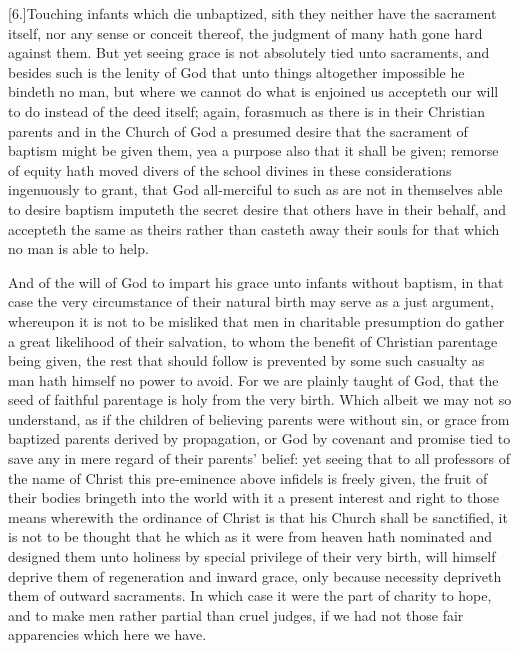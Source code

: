 [6.]Touching infants which die unbaptized, sith they  neither have the sacrament itself, nor any sense or conceit thereof, the judgment of many hath gone hard against them. But yet seeing grace is not absolutely tied unto sacraments, and besides such is the lenity of God that unto things altogether impossible he bindeth no man, but where we cannot do what is enjoined us accepteth our will to do instead of the deed itself; again, forasmuch as there is in their Christian parents and in the Church of God a presumed desire that the sacrament of baptism might be given them, yea a purpose also that it shall be given; remorse of equity hath moved divers of the school divines in these considerations ingenuously to grant, that God all-merciful to such as are not in themselves able to desire baptism imputeth the secret desire that others have in their behalf, and accepteth the same as theirs rather than casteth away their souls for that which no man is able to help.

And of the will of God to impart his grace unto infants without baptism, in that case the very circumstance of their natural birth may serve as a just argument, whereupon it is not to be misliked that men in charitable presumption do  gather a great likelihood of their salvation, to whom the benefit of Christian parentage being given, the rest that should follow is prevented by some such casualty as man hath himself no power to avoid.
 For we are plainly taught of God, that the seed of faithful parentage is holy from the very birth. Which albeit we may not so understand, as if the children of believing parents were without sin, or grace from baptized parents derived by propagation, or God by covenant and promise tied to save any in mere regard of their parents’ belief: yet seeing that to all professors of the name of Christ this pre-eminence above infidels is freely given, the fruit of their bodies bringeth into the world with it a present interest and right to those means wherewith the ordinance of Christ is that his Church shall be sanctified, it is not to be thought that he which as it were from heaven hath nominated and designed them unto holiness by special privilege of their very birth, will himself deprive them of regeneration and inward grace, only because necessity depriveth them of outward sacraments. In which case it were the part of charity to hope, and to make men rather partial than cruel judges, if we had not those fair apparencies which here we have.

